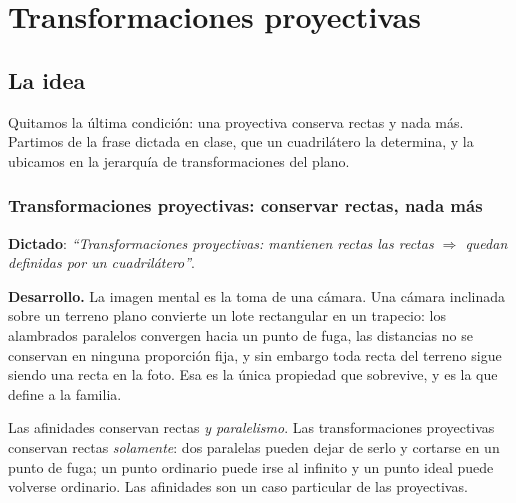 \chapter{Transformaciones proyectivas}\label{cap:07}\label{sec:bloque-proyectivas}

\section{La idea}

Quitamos la última condición: una proyectiva conserva rectas y nada más. Partimos de la frase dictada en clase, que un cuadrilátero la determina, y la ubicamos en la jerarquía de transformaciones del plano.

\subsection{Transformaciones proyectivas: conservar rectas, nada más}\label{sec:proyectivas-primera}

{\small\vspace{1mm}\par}


\textbf{Dictado}: \emph{``Transformaciones proyectivas: mantienen rectas las rectas
\(\Rightarrow\) quedan definidas por un cuadrilátero''}.

\textbf{Desarrollo.} La imagen mental es la toma de una cámara. Una cámara inclinada sobre un
terreno plano convierte un lote rectangular en un trapecio: los alambrados paralelos
convergen hacia un punto de fuga, las distancias no se conservan en ninguna proporción fija,
y sin embargo toda recta del terreno sigue siendo una recta en la foto. Esa es la única
propiedad que sobrevive, y es la que define a la familia.

\begin{idea}
Las afinidades conservan rectas \emph{y paralelismo}. Las transformaciones proyectivas
conservan rectas \emph{solamente}: dos paralelas pueden dejar de serlo y cortarse en un punto
de fuga; un punto ordinario puede irse al infinito y un punto ideal puede volverse ordinario.
Las afinidades son un caso particular de las proyectivas.
\end{idea}

